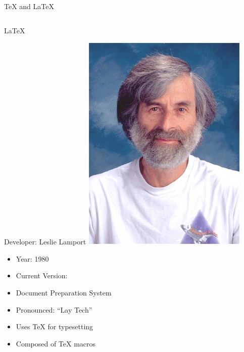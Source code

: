 \documentclass{beamer}
\begin{document}
\begin{frame}{\TeX{} and \LaTeX}
\begin{columns}[t]
  \begin{center}
    {\large \LaTeX}
    \begin{block}{Developer: Leslie Lamport}
     \centering
      \includegraphics[height=0.20\textheight]{pics/Leslie_Lamport.jpg}
    \end{block}
    {\tiny
    \begin{itemize}    
    \item Year: 1980
    \item Current Version: \LaTeXe
    \item Document Preparation System  
    \item Pronounced: ``Lay Tech''
    \item Uses \TeX{} for typesetting
    \item Composed of \TeX{} macros
    \end{itemize}
    }
    \end{center}
 \end{columns}
\end{frame}
\end{document}
